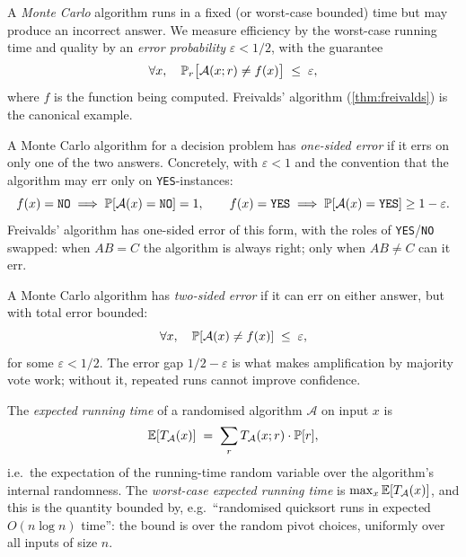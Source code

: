 \begin{definition}
\label{def:monte_carlo}
A \emph{Monte Carlo} algorithm runs in a fixed (or worst-case bounded) time but may produce an incorrect answer. We measure efficiency by the worst-case running time and quality by an \emph{error probability} $\varepsilon < 1/2$, with the guarantee
\[
  \forall x,\quad \operatorname{\mathbb{P}}_r\bigl[\mathcal{A}(x; r) \ne f(x)\bigr] \;\le\; \varepsilon,
\]
where $f$ is the function being computed. Freivalds' algorithm (\cref{thm:freivalds}) is the canonical example.
\end{definition}

\begin{definition}
\label{def:one_sided_error}
A Monte Carlo algorithm for a decision problem has \emph{one-sided error} if it errs on only one of the two answers. Concretely, with $\varepsilon < 1$ and the convention that the algorithm may err only on \texttt{YES}-instances:
\[
  f(x) = \texttt{NO} \implies \operatorname{\mathbb{P}}[\mathcal{A}(x) = \texttt{NO}] = 1,
  \qquad f(x) = \texttt{YES} \implies \operatorname{\mathbb{P}}[\mathcal{A}(x) = \texttt{YES}] \ge 1 - \varepsilon.
\]
Freivalds' algorithm has one-sided error of this form, with the roles of \texttt{YES}/\texttt{NO} swapped: when $AB = C$ the algorithm is always right; only when $AB \ne C$ can it err.
\end{definition}

\begin{definition}
\label{def:two_sided_error}
A Monte Carlo algorithm has \emph{two-sided error} if it can err on either answer, but with total error bounded:
\[
  \forall x,\quad \operatorname{\mathbb{P}}[\mathcal{A}(x) \ne f(x)] \;\le\; \varepsilon,
\]
for some $\varepsilon < 1/2$. The error gap $1/2 - \varepsilon$ is what makes amplification by majority vote work; without it, repeated runs cannot improve confidence.
\end{definition}

\begin{definition}
\label{def:expected_runtime}
The \emph{expected running time} of a randomised algorithm $\mathcal{A}$ on input $x$ is
\[
  \operatorname{\mathbb{E}}[T_\mathcal{A}(x)] \;=\; \sum_{r} T_\mathcal{A}(x; r) \cdot \operatorname{\mathbb{P}}[r],
\]
i.e.\ the expectation of the running-time random variable over the algorithm's internal randomness. The \emph{worst-case expected running time} is $\max_x \operatorname{\mathbb{E}}[T_\mathcal{A}(x)]$, and this is the quantity bounded by, e.g.\ ``randomised quicksort runs in expected $O(n \log n)$ time'': the bound is over the random pivot choices, uniformly over all inputs of size $n$.
\end{definition}

